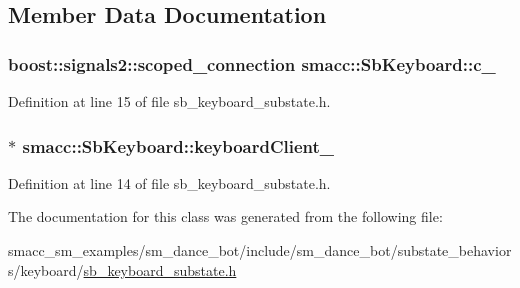 \subsection{Member Data Documentation}
\subsubsection[{\texorpdfstring{c\+\_\+}{c_}}]{\setlength{\rightskip}{0pt plus 5cm}boost\+::signals2\+::scoped\+\_\+connection smacc\+::\+Sb\+Keyboard\+::c\+\_\+}\hypertarget{classsmacc_1_1SbKeyboard_a3dca4a0e69f1e2d306c98d22c620816c}{}\label{classsmacc_1_1SbKeyboard_a3dca4a0e69f1e2d306c98d22c620816c}


Definition at line 15 of file sb\+\_\+keyboard\+\_\+substate.\+h.

\subsubsection[{\texorpdfstring{keyboard\+Client\+\_\+}{keyboardClient_}}]{$\ast$ smacc\+::\+Sb\+Keyboard\+::keyboard\+Client\+\_\+}\hypertarget{classsmacc_1_1SbKeyboard_af1dd6f1c0f3e8d7222a13a185b649726}{}\label{classsmacc_1_1SbKeyboard_af1dd6f1c0f3e8d7222a13a185b649726}


Definition at line 14 of file sb\+\_\+keyboard\+\_\+substate.\+h.



The documentation for this class was generated from the following file\+:\begin{DoxyCompactItemize}
\item 
smacc\+\_\+sm\+\_\+examples/sm\+\_\+dance\+\_\+bot/include/sm\+\_\+dance\+\_\+bot/substate\+\_\+behaviors/keyboard/\hyperlink{sb__keyboard__substate_8h}{sb\+\_\+keyboard\+\_\+substate.\+h}\end{DoxyCompactItemize}
